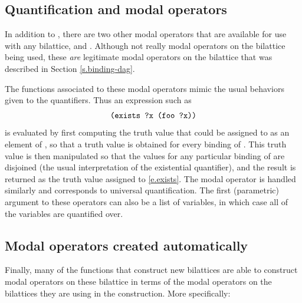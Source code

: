 \subsection{Quantification and modal operators}

In addition to , there are two other modal operators that
are available for use with any bilattice,  and
.  Although not really modal operators on the bilattice
being used, these {\em are\/} legitimate modal operators on the bilattice
 that was described in Section \ref{s.binding-dag}.

The functions associated to these modal operators mimic the usual behaviors
given to the quantifiers.  Thus an expression such as
 \begin{equation}
\mbox{\tt (exists ?x (foo ?x))}
\label{e.exists}
\end{equation}
 is evaluated by first computing the truth value that could be assigned
to  as an element of , so that
a truth value is obtained for every binding of .  This truth
value is then manipulated so that the values for any particular binding
of  are disjoined (the usual interpretation of the existential
quantifier), and the result is returned as the truth value assigned to
\ref{e.exists}.  The modal operator  is handled similarly
and corresponds to universal quantification.  The first (parametric)
argument to these operators can also be a list of variables, in which
case all of the variables are quantified over.

\subsection{Modal operators created automatically}

Finally, many of the functions that construct new bilattices are able
to construct modal operators on these bilattice in terms of the modal
operators on the bilattices they are using in the construction.  More
specifically:

